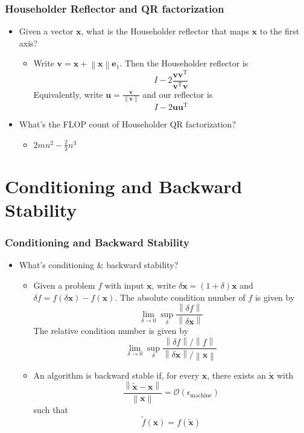 \documentclass[10pt]{beamer}
\newcommand{\norm}[1]{\left\lVert#1\right\rVert}
\renewcommand{\vec}[1]{\boldsymbol{#1}}
\newcommand{\T}{\mathrm{T}}
\newcommand{\bigO}[1]{\mathcal{O}\left(#1\right)}
\newcommand{\perturb}[1]{\tilde{#1}}
\newcommand{\epsmach}{\epsilon_{\text{machine}}}
\newcommand{\subitem}[1]{\begin{itemize}\item #1\end{itemize}}
\begin{document}
\begin{frame}
  \frametitle{Householder Reflector and QR factorization}
  \begin{itemize}[<+->]
    \item Given a vector \(\vec{x}\), what is the Householder reflector that maps \(\vec{x}\) to the first axis?
    \subitem{Write \(\vec{v} = \vec{x} + \norm{\vec{x}}\vec{e}_1\). Then the Householder reflector is \[I - 2\frac{\vec{v}\vec{v}^{\T}}{\vec{v}^{\T}\vec{v}}\] Equivalently, write \(\vec{u}=\frac{\vec{v}}{\norm{\vec{v}}}\) and our reflector is \[I - 2\vec{u}\vec{u}^{\T}\]\vspace{-5mm}}
    \item What’s the FLOP count of Householder QR factorization?
    \subitem{\(2mn^2-\frac{2}{3}n^3\)}
  \end{itemize}
\end{frame}

\section{Conditioning and Backward Stability}
\begin{frame}
  \frametitle{Conditioning and Backward Stability}
  \begin{itemize}[<+->]
    \item What’s conditioning \& backward stability?
    \subitem{Given a problem \(f\) with input \(\vec{x}\), write \(\delta \vec{x} = (1 + \delta)\vec{x}\) and \(\delta f=f\left(\delta \vec{x}\right) - f(\vec{x})\). The \alert{absolute condition number} of \(f\) is given by \[\lim_{\delta\to0}\sup_{\delta}\frac{\norm{\delta f}}{\norm{\delta \vec{x}}}\] The \alert{relative condition number} is given by \[\lim_{\delta\to0}\sup_{\delta}\frac{\norm{\delta f}/\norm{f}}{\norm{\delta \vec{x}}/\norm{\vec{x}}}\]\vspace{-5mm}}
    \subitem{An algorithm is \alert{backward stable} if, for every \(\vec{x}\), there exists an \(\perturb{\vec{x}}\) with \[\frac{\norm{\perturb{\vec{x}} - \vec{x}}}{\norm{\vec{x}}}=\bigO{\epsmach}\] such that \[\perturb{f}(\vec{x}) = f(\perturb{\vec{x}})\]}
  \end{itemize}
\end{frame}
\end{document}
